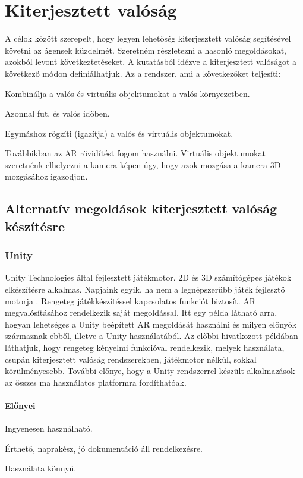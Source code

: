 \documentclass[12pt,a4paper,oneside]{report} %
\begin{document}
\section{Kiterjesztett valóság}
\label{kitvalo}
A célok között szerepelt, hogy legyen lehetőség kiterjesztett valóság segítésével követni az ágensek küzdelmét. Szeretném részletezni a hasonló megoldásokat, azokból levont következtetéseket.
A \cite{azuma2001recent} kutatásból idézve a kiterjesztett valóságot a következő módon definiálhatjuk. Az a rendszer, ami a következőket teljesíti:
\begin{compactitem}
	\item Kombinálja a valós és virtuális objektumokat a valós környezetben.
	\item Azonnal fut, és valós időben.
	\item Egymáshoz rögzíti (igazítja) a valós és virtuális objektumokat.
\end{compactitem}
Továbbikban az AR rövidítést fogom használni. 
Virtuális objektumokat szeretnénk elhelyezni a kamera képen úgy, hogy azok mozgása a kamera 3D mozgásához igazodjon. 
\subsection{Alternatív megoldások kiterjesztett valóság készítésre}
\label{kitval}
\subsubsection{Unity}
Unity Technologies által fejlesztett játékmotor. 2D és 3D számítógépes játékok elkészítésre alkalmas. Napjaink egyik, ha nem a legnépszerűbb játék fejlesztő motorja \cite{haas2014history}.
Rengeteg játékkészítéssel kapcsolatos funkciót biztosít. AR megvalósításához rendelkezik saját megoldással. Itt \cite{kim2014using} egy példa látható arra, hogyan lehetséges a Unity beépített AR megoldását használni és milyen előnyök származnak ebből, illetve a Unity használatából. Az előbbi hivatkozott példában láthatjuk, hogy rengeteg kényelmi funkcióval rendelkezik, melyek használata, csupán kiterjesztett valóság rendszerekben, játékmotor nélkül, sokkal körülményesebb.  További előnye, hogy a Unity rendszerrel készült alkalmazások az összes ma használatos platformra fordíthatóak. 
\paragraph{Előnyei} 
\begin{compactitem}
	\item Ingyenesen használható.
	\item Érthető, naprakész, jó dokumentáció áll rendelkezésre.
	\item Használata könnyű.
\end{compactitem}
\end{document}
